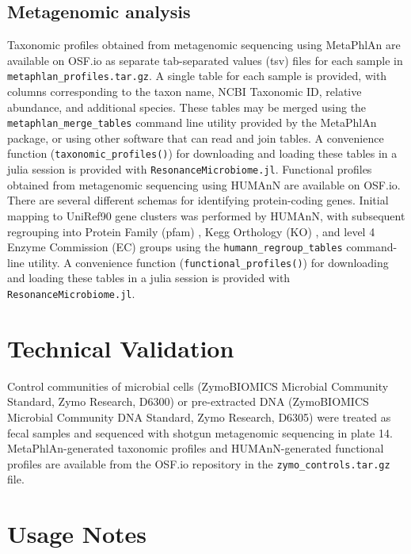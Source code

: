 \documentclass[fleqn,10pt]{wlscirep}
\begin{document}
\subsection*{Metagenomic analysis}

Taxonomic profiles obtained from metagenomic sequencing using MetaPhlAn are available on OSF.io
as separate tab-separated values (tsv) files for each sample in \verb|metaphlan_profiles.tar.gz|.
A single table for each sample is provided,
with columns corresponding to the taxon name, NCBI Taxonomic ID, relative abundance, and additional species.
These tables may be merged using the \verb|metaphlan_merge_tables| command line utility provided by the MetaPhlAn package,
or using other software that can read and join tables.
A convenience function (\verb|taxonomic_profiles()|) for downloading and loading these tables in a julia session
is provided with \verb|ResonanceMicrobiome.jl|.
Functional profiles obtained from metagenomic sequencing using HUMAnN are available on OSF.io.
There are several different schemas for identifying protein-coding genes.
Initial mapping to UniRef90 \cite{UniProt_Consortium2010-ls} gene clusters was performed by HUMAnN,
with subsequent regrouping into Protein Family (pfam) \cite{Bateman2004-cz,El-Gebali2019-jh}, Kegg Orthology (KO) \cite{Kanehisa2000-rx,Kanehisa2008-gg},
and level 4 Enzyme Commission (EC) \cite{Bairoch2000-ot} groups using the \verb|humann_regroup_tables| command-line utility.
A convenience function (\verb|functional_profiles()|) for downloading and loading these tables in a julia session
is provided with \verb|ResonanceMicrobiome.jl|.

\section*{Technical Validation}

Control communities of microbial cells (ZymoBIOMICS Microbial Community Standard, Zymo Research, D6300)
or pre-extracted DNA (ZymoBIOMICS Microbial Community DNA Standard, Zymo Research, D6305)
were treated as fecal samples and sequenced with shotgun metagenomic sequencing in plate 14.
MetaPhlAn-generated taxonomic profiles and HUMAnN-generated functional profiles
are available from the OSF.io repository in the \verb|zymo_controls.tar.gz| file.

\section*{Usage Notes}
\end{document}
